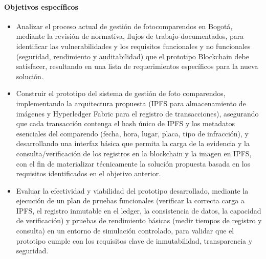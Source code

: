 \paragraph{Objetivos específicos}
\begin{itemize}
    \item Analizar el proceso actual de gestión de fotocomparendos en Bogotá, mediante la revisión de normativa, flujos de trabajo documentados, para identificar las vulnerabilidades y los requisitos funcionales y no funcionales (seguridad, rendimiento y auditabilidad) que el prototipo Blockchain debe satisfacer, resultando en una lista de requerimientos específicos para la nueva solución.
    \item Construir el prototipo del sistema de gestión de foto comparendos, implementando la arquitectura propuesta (IPFS para almacenamiento de imágenes y Hyperledger Fabric para el registro de transacciones), asegurando que cada transacción contenga el hash único de IPFS y los metadatos esenciales del comparendo (fecha, hora, lugar, placa, tipo de infracción), y desarrollando una interfaz básica que permita la carga de la evidencia y la consulta/verificación de los registros en la blockchain y la imagen en IPFS, con el fin de materializar técnicamente la solución propuesta basada en los requisitos identificados en el objetivo anterior.
    \item Evaluar la efectividad y viabilidad del prototipo desarrollado, mediante la ejecución de un plan de pruebas funcionales (verificar la correcta carga a IPFS, el registro inmutable en el ledger, la consistencia de datos, la capacidad de verificación) y pruebas de rendimiento básicas (medir tiempos de registro y consulta) en un entorno de simulación controlado, para validar que el prototipo cumple con los requisitos clave de inmutabilidad, transparencia y seguridad.
\end{itemize} 